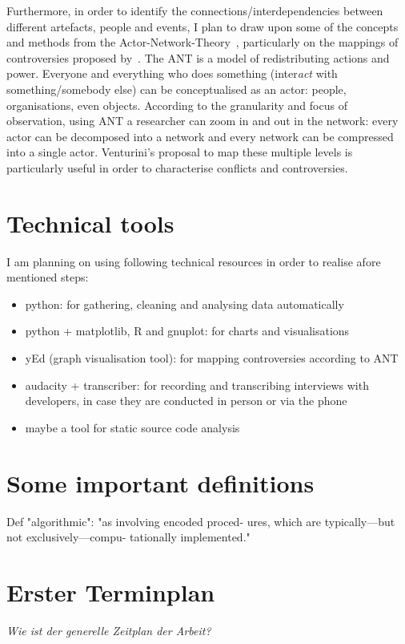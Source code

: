 \documentclass[pdftex,a4paper,11pt]{scrartcl}
\begin{document}
Furthermore, in order to identify the connections/interdependencies between different artefacts, people and events, I plan to draw upon some of the concepts and methods from the Actor-Network-Theory~\cite{Latour2010}, particularly on the mappings of controversies proposed by~\cite{Venturini2010a}.
The ANT is a model of redistributing actions and power.
Everyone and everything who does something (inter\emph{act} with something/somebody else) can be conceptualised as an actor: people, organisations, even objects.
According to the granularity and focus of observation, using ANT a researcher can zoom in and out in the network: every actor can be decomposed into a network and every network can be compressed into a single actor.
Venturini's proposal to map these multiple levels is particularly useful in order to characterise conflicts and controversies.

\section{Technical tools}

I am planning on using following technical resources in order to realise afore mentioned steps:

\begin{itemize}
    \item python: for gathering, cleaning and analysing data automatically
    \item python + matplotlib, R and gnuplot: for charts and visualisations
    \item yEd (graph visualisation tool): for mapping controversies according to ANT
    \item audacity + transcriber: for recording and transcribing interviews with developers, in case they are conducted in person or via the phone
    \item maybe a tool for static source code analysis
\end{itemize}

\section{Some important definitions}
Def "algorithmic": "as involving encoded proced-
ures, which are typically—but not exclusively—compu-
tationally implemented."~\cite{Geiger2017}

\section{Erster Terminplan}
\noindent  \emph{Wie ist der generelle Zeitplan der Arbeit? }
\end{document}
